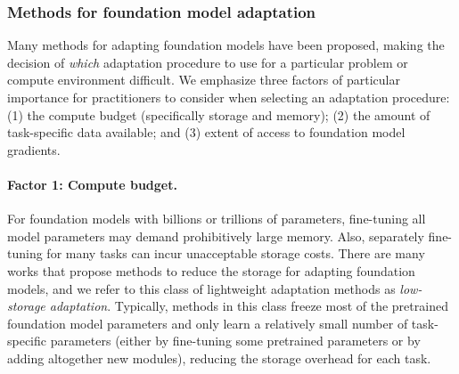 \subsubsection{Methods for foundation model adaptation}
Many methods for adapting foundation models have been proposed, making the decision of \textit{which} adaptation procedure to use for a particular problem or compute environment difficult. We emphasize three factors of particular importance for practitioners to consider when selecting an adaptation procedure: (1) the compute budget (specifically storage and memory); (2) the amount of task-specific data available; and (3) extent of access to foundation model gradients.
\noindent\paragraph{Factor 1: Compute budget.} For foundation models with billions or trillions of parameters, fine-tuning all model parameters may demand prohibitively large memory. Also, separately fine-tuning for many tasks can incur unacceptable storage costs. 
There are many works that propose methods to reduce the storage for adapting foundation models, and we refer to this class of lightweight adaptation methods as \textit{low-storage adaptation}. 
Typically, methods in this class freeze most of the pretrained foundation model parameters and only learn a relatively small number of task-specific parameters (either by fine-tuning some pretrained parameters or by adding altogether new modules), reducing the storage overhead for each task.

